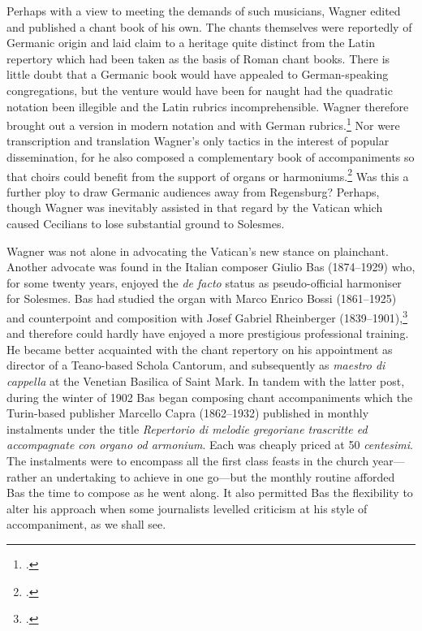 Perhaps with a view to meeting the demands of such musicians, Wagner edited and published a chant book of his own.
The chants themselves were reportedly of Germanic origin and laid claim to a heritage quite distinct from the Latin repertory which had been taken as the basis of Roman chant books.
There is little doubt that a Germanic book would have appealed to German-speaking congregations, but the venture would have been for naught had the quadratic notation been illegible and the Latin rubrics incomprehensible.
Wagner therefore brought out a version in modern notation and with German rubrics.\footcites[p.~iii]{WagnerKyrialesiveOrdinarium1904}[p.~iii]{WagnerKyrialegewoehnlichenMessgesaenge1904}
Nor were transcription and translation Wagner's only tactics in the interest of popular dissemination, for he also composed a complementary book of accompaniments so that choirs could benefit from the support of organs or harmoniums.\footnote{\covid{}\cite{WagnerOrgelbegleitungKyrialenach1904}.\label{fn:wagner_1904accomps}}
Was this a further ploy to draw Germanic audiences away from Regensburg?
Perhaps, though Wagner was inevitably assisted in that regard by the Vatican which caused Cecilians to lose substantial ground to Solesmes.

Wagner was not alone in advocating the Vatican's new stance on plainchant.
Another advocate was found in the Italian composer Giulio Bas (1874--1929) who, for some twenty years, enjoyed the \emph{de facto} status as pseudo-official harmoniser for Solesmes.
Bas had studied the organ with Marco Enrico Bossi (1861--1925) and counterpoint and composition with Josef Gabriel Rheinberger (1839--1901),\footcites[95]{GiulioBas1907}[42]{ScraperJosefGabrielRheinberger2006} and therefore could hardly have enjoyed a more prestigious professional training.
He became better acquainted with the chant repertory on his appointment as director of a Teano-based Schola Cantorum, and subsequently as \emph{maestro di cappella} at the Venetian Basilica of Saint Mark.
In tandem with the latter post, during the winter of 1902 Bas began composing chant accompaniments which the Turin-based publisher Marcello Capra (1862--1932) published in monthly instalments under the title \emph{Repertorio di melodie gregoriane trascritte ed accompagnate con organo od armonium}.
Each was cheaply priced at 50 \emph{centesimi}.
The instalments were to encompass all the first class feasts in the church year---rather an undertaking to achieve in one go---but the monthly routine afforded Bas the time to compose as he went along.
It also permitted Bas the flexibility to alter his approach when some journalists levelled criticism at his style of accompaniment, as we shall see.

